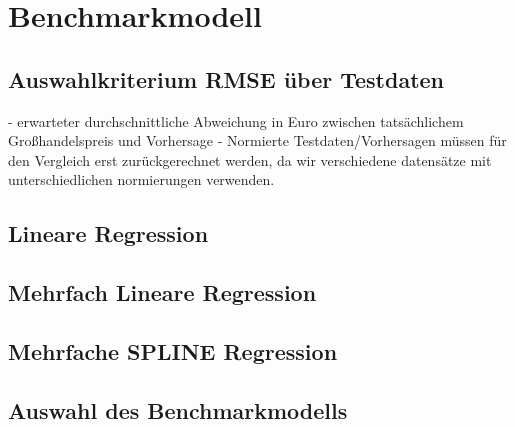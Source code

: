 \section{Benchmarkmodell}

\subsection{Auswahlkriterium RMSE über Testdaten}
- erwarteter durchschnittliche Abweichung in Euro zwischen tatsächlichem Großhandelspreis und Vorhersage 
- Normierte Testdaten/Vorhersagen müssen für den Vergleich erst zurückgerechnet werden, da wir verschiedene datensätze mit unterschiedlichen normierungen verwenden.

\subsection{Lineare Regression}

\subsection{Mehrfach Lineare Regression}

\subsection{Mehrfache SPLINE Regression}

\subsection{Auswahl des Benchmarkmodells}
